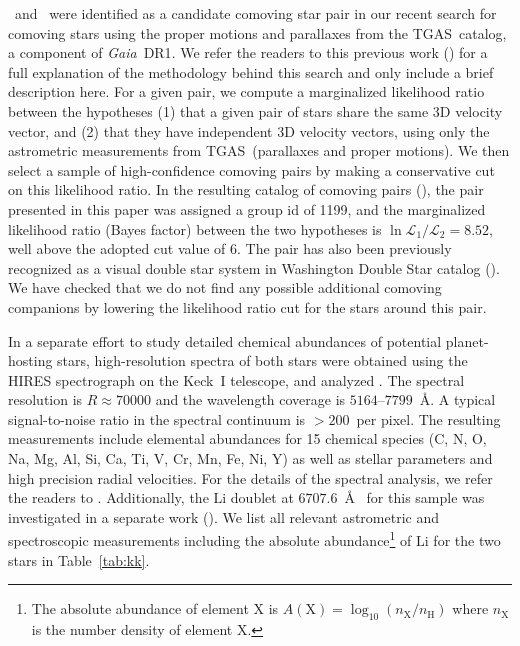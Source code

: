 \documentclass[modern, letterpaper]{aastex61}
\newcommand{\project}[1]{\textsl{#1}}
\newcommand{\acronym}[1]{{\small{#1}}}
\newcommand{\gaia}{\project{Gaia}}
\newcommand{\figname}{Figure}
\newcommand{\dr}{\acronym{DR1}}
\newcommand{\tgas}{\acronym{TGAS}}
\newcommand*\elem[1]{\ensuremath{\mathrm{#1}}}
\newcommand{\sunanalog}{\text{Krios}}
\newcommand{\bizarreone}{\text{Kronos}}
\begin{document}
\sunanalog\ and \bizarreone\ were identified as a
candidate comoving star pair in our recent search for comoving stars using the
proper motions and parallaxes from the \tgas\ catalog, a component of \gaia\ \dr.
We refer the readers to this previous work (\citealt{2017AJ....153..257O}) for a
full explanation of the methodology behind this search and only include
a brief description here.
For a given pair, we compute a marginalized likelihood ratio between the
hypotheses (1) that a given pair of stars share the same 3D velocity vector,
and (2) that they have independent 3D velocity vectors, using only the
astrometric measurements from \tgas\ (parallaxes and proper motions).
We then select a sample of high-confidence comoving pairs by making a
conservative cut on this likelihood ratio.
In the resulting catalog of comoving pairs (\citealt{2017AJ....153..257O}),
the pair presented in this paper was assigned a group id of 1199,
and the marginalized likelihood ratio (Bayes factor)
between the two hypotheses is $\ln{\mathcal{L}_1/\mathcal{L}_2} = 8.52$,
well above the adopted cut value of 6.
The pair has also been previously recognized as a visual double star system
in Washington Double Star catalog (\citealt{2001AJ....122.3466M}).
We have checked that we do not find any possible additional comoving companions
by lowering the likelihood ratio cut for the stars around this pair.

In a separate effort to study detailed chemical abundances of potential
planet-hosting stars, high-resolution spectra of both stars were obtained using
the HIRES spectrograph on the Keck~I telescope, and analyzed
\citep{2016ApJS..225...32B}.
The spectral resolution is $R\approx 70000$ and the wavelength coverage is
$5164$--$7799$~\AA.
A typical signal-to-noise ratio in the spectral continuum is $>200$~per pixel.
The resulting measurements include elemental abundances for 15 chemical species
(C, N, O, Na, Mg, Al, Si, Ca, Ti, V, Cr, Mn, Fe, Ni, Y) as well as stellar parameters
and high precision radial velocities.
For the details of the spectral analysis, we refer the readers to
\citealt{2016ApJS..225...32B}.
Additionally, the \elem{Li} doublet at $6707.6$~\AA\
for this sample was investigated in a separate work (\citealt{jmlithium}).
We list all relevant astrometric and spectroscopic measurements
including the absolute abundance\footnote{
  The absolute abundance of element \elem{X} is
  $A(\elem{X}) = \log_{10} (n_\elem{X}/n_\elem{H})$
  where $n_\elem{X}$ is the number density of element \elem{X}.
}
of \elem{Li} for the two stars in Table~\ref{tab:kk}.
\end{document}
